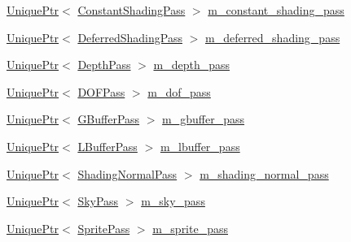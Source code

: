 \begin{DoxyCompactItemize}
\item 
\hyperlink{namespacemage_a3316d7143a973e37adf1110f2e80ca31}{Unique\+Ptr}$<$ \hyperlink{classmage_1_1_constant_shading_pass}{Constant\+Shading\+Pass} $>$ \hyperlink{classmage_1_1_renderer_af6536c9471209a50c8630e0b49a45177}{m\+\_\+constant\+\_\+shading\+\_\+pass}
\item 
\hyperlink{namespacemage_a3316d7143a973e37adf1110f2e80ca31}{Unique\+Ptr}$<$ \hyperlink{classmage_1_1_deferred_shading_pass}{Deferred\+Shading\+Pass} $>$ \hyperlink{classmage_1_1_renderer_a0179c9a4fe8b2c6d090a96adc94383b0}{m\+\_\+deferred\+\_\+shading\+\_\+pass}
\item 
\hyperlink{namespacemage_a3316d7143a973e37adf1110f2e80ca31}{Unique\+Ptr}$<$ \hyperlink{classmage_1_1_depth_pass}{Depth\+Pass} $>$ \hyperlink{classmage_1_1_renderer_a8c0dc117b4df9685e9e049175e5a91a6}{m\+\_\+depth\+\_\+pass}
\item 
\hyperlink{namespacemage_a3316d7143a973e37adf1110f2e80ca31}{Unique\+Ptr}$<$ \hyperlink{classmage_1_1_d_o_f_pass}{D\+O\+F\+Pass} $>$ \hyperlink{classmage_1_1_renderer_aa0c9add6ebb5bf1ace9592c6041bf5a8}{m\+\_\+dof\+\_\+pass}
\item 
\hyperlink{namespacemage_a3316d7143a973e37adf1110f2e80ca31}{Unique\+Ptr}$<$ \hyperlink{classmage_1_1_g_buffer_pass}{G\+Buffer\+Pass} $>$ \hyperlink{classmage_1_1_renderer_a7f36e74990c2c32d7fa26cdc00f86009}{m\+\_\+gbuffer\+\_\+pass}
\item 
\hyperlink{namespacemage_a3316d7143a973e37adf1110f2e80ca31}{Unique\+Ptr}$<$ \hyperlink{structmage_1_1_l_buffer_pass}{L\+Buffer\+Pass} $>$ \hyperlink{classmage_1_1_renderer_a7f60c763f2636bd1ea608b69a5924996}{m\+\_\+lbuffer\+\_\+pass}
\item 
\hyperlink{namespacemage_a3316d7143a973e37adf1110f2e80ca31}{Unique\+Ptr}$<$ \hyperlink{classmage_1_1_shading_normal_pass}{Shading\+Normal\+Pass} $>$ \hyperlink{classmage_1_1_renderer_a1867f2dd151f3180b8efebba5b018fc8}{m\+\_\+shading\+\_\+normal\+\_\+pass}
\item 
\hyperlink{namespacemage_a3316d7143a973e37adf1110f2e80ca31}{Unique\+Ptr}$<$ \hyperlink{classmage_1_1_sky_pass}{Sky\+Pass} $>$ \hyperlink{classmage_1_1_renderer_a7e9d76a3294d0a5b2d99a5335ff0cd04}{m\+\_\+sky\+\_\+pass}
\item 
\hyperlink{namespacemage_a3316d7143a973e37adf1110f2e80ca31}{Unique\+Ptr}$<$ \hyperlink{classmage_1_1_sprite_pass}{Sprite\+Pass} $>$ \hyperlink{classmage_1_1_renderer_ae6850abe92b8d03f3eefbfb34fe9e5d8}{m\+\_\+sprite\+\_\+pass}
\item 

\end{DoxyCompactItemize}
